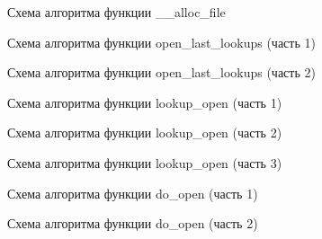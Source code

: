 \clearpage

\vspace*{\fill}
\begin{figure}[h]
    \centering
    \def\svgwidth{\textwidth}
    
    \caption{Схема алгоритма функции \_\_alloc\_file}
\end{figure}
\vfill

\clearpage

\vspace*{\fill}
\begin{figure}[h]
    \centering
    \def\svgwidth{\textwidth}
    
    \caption{Схема алгоритма функции open\_last\_lookups (часть 1)}
\end{figure}
\vfill

\clearpage

\vspace*{\fill}
\begin{figure}[h]
    \centering
    \def\svgwidth{0.8\textwidth}
    
    \caption{Схема алгоритма функции open\_last\_lookups (часть 2)}
\end{figure}
\vfill

\clearpage

\vspace*{\fill}
\begin{figure}[h]
    \centering
    \def\svgwidth{\textwidth}
    
    \caption{Схема алгоритма функции lookup\_open (часть 1)}
\end{figure}
\vfill

\clearpage

\vspace*{\fill}
\begin{figure}[h]
    \centering
    \def\svgwidth{\textwidth}
    
    \caption{Схема алгоритма функции lookup\_open (часть 2)}
\end{figure}
\vfill

\clearpage

\vspace*{\fill}
\begin{figure}[h]
    \centering
    \def\svgwidth{\textwidth}
    
    \caption{Схема алгоритма функции lookup\_open (часть 3)}
\end{figure}
\vfill

\clearpage

\vspace*{\fill}
\begin{figure}[h]
    \centering
    \def\svgwidth{0.9\textwidth}
    
    \caption{Схема алгоритма функции do\_open (часть 1)}
\end{figure}
\vfill

\clearpage

\vspace*{\fill}
\begin{figure}[h]
    \centering
    \def\svgwidth{0.9\textwidth}
    
    \caption{Схема алгоритма функции do\_open (часть 2)}
\end{figure}
\vfill
